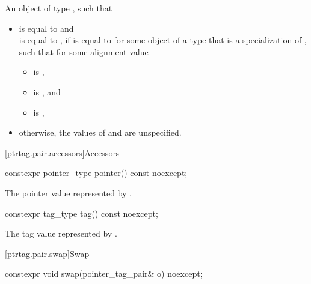 \begin{itemdescr}
\pnum
\returns
An object  of type , such that
\begin{itemize}
\item
{} is equal to  and\\
 is equal to ,
if  is equal to 
for some object  of a type that is a specialization of ,
such that for some alignment value 
\begin{itemize}
\item {} is ,
\item {} is , and
\item {} is ,
\end{itemize}
\item
otherwise, the values of  and  are unspecified.
\end{itemize}
\end{itemdescr}

[ptrtag.pair.accessors]{Accessors}

%
\begin{itemdecl}
constexpr pointer_type pointer() const noexcept;
\end{itemdecl}

\begin{itemdescr}
\pnum
\returns
The pointer value represented by .
\end{itemdescr}

%
\begin{itemdecl}
constexpr tag_type tag() const noexcept;
\end{itemdecl}

\begin{itemdescr}
\pnum
\returns
The tag value represented by .
\end{itemdescr}

[ptrtag.pair.swap]{Swap}

%
\begin{itemdecl}
constexpr void swap(pointer_tag_pair& o) noexcept;
\end{itemdecl}

